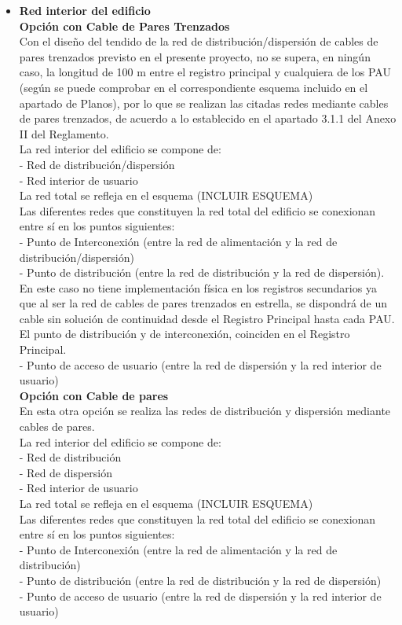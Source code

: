 \begin{itemize}
	\item \textbf{Red interior del edificio}\\
\textbf{Opción con Cable de Pares Trenzados}\\
Con el diseño del tendido de la red de distribución/dispersión de cables de pares trenzados
previsto en el presente proyecto, no se supera, en ningún caso, la longitud de 100 m entre el
registro principal y cualquiera de los PAU (según se puede comprobar en el correspondiente
esquema incluido en el apartado de Planos), por lo que se realizan las citadas redes mediante
cables de pares trenzados, de acuerdo a lo establecido en el apartado 3.1.1 del Anexo II del
Reglamento.\\
La red interior del edificio se compone de:\\
- Red de distribución/dispersión\\
- Red interior de usuario\\
La red total se refleja en el esquema (INCLUIR ESQUEMA)\\
Las diferentes redes que constituyen la red total del edificio se conexionan entre sí en los puntos
siguientes:\\
- Punto de Interconexión (entre la red de alimentación y la red de distribución/dispersión)\\
- Punto de distribución (entre la red de distribución y la red de dispersión). En este caso no tiene implementación física en los registros secundarios ya que al ser la red de cables de pares trenzados en estrella, se dispondrá de un cable sin solución de continuidad desde el Registro Principal hasta cada PAU. El punto de distribución y de interconexión, coinciden en el Registro Principal.\\
- Punto de acceso de usuario (entre la red de dispersión y la red interior de usuario)\\

\textbf{Opción con Cable de pares}\\
En esta otra opción se realiza las redes de distribución y dispersión mediante cables de pares.\\
La red interior del edificio se compone de:\\
- Red de distribución\\
- Red de dispersión\\
- Red interior de usuario\\
La red total se refleja en el esquema (INCLUIR ESQUEMA)\\
Las diferentes redes que constituyen la red total del edificio se conexionan entre sí en los puntos
siguientes:\\
- Punto de Interconexión (entre la red de alimentación y la red de distribución)\\
- Punto de distribución (entre la red de distribución y la red de dispersión)\\
- Punto de acceso de usuario (entre la red de dispersión y la red interior de usuario)\\

\end{itemize}

